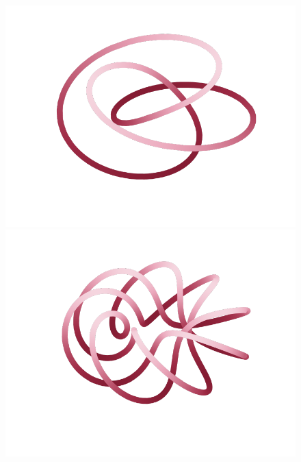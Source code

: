 \begin{figure}[H]
    \begin{minipage}[b]{.3\linewidth}
        \centering
        \includegraphics[width=\linewidth]{../data/torus-p3-q2.pdf}
    \end{minipage}
    \begin{minipage}[b]{.3\linewidth}
        \centering
        \includegraphics[width=\linewidth]{../data/torus-p3-q8.pdf}
    \end{minipage}
    \begin{minipage}[b]{.3\linewidth}
        \centering

\end{minipage}
\end{figure}

